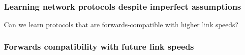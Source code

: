 \begin{frame}
\frametitle{Learning network protocols despite imperfect assumptions}
\begin{centering}
Can we learn protocols that are forwards-compatible with higher link speeds?
\end{centering}
\end{frame}


\begin{frame}
\frametitle{Forwards compatibility with future link speeds}
\begin{centering}

\noindent {}


\end{centering}
\end{frame}

